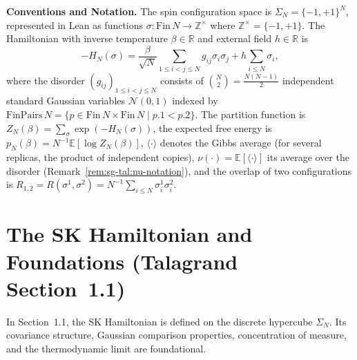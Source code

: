 \medskip\noindent\textbf{Conventions and Notation.}
The spin configuration space is $\Sigma_N = \{-1, +1\}^N$, represented in Lean as functions $\sigma : \mathrm{Fin}\,N \to \mathbb{Z}^\times$ where $\mathbb{Z}^\times = \{-1, +1\}$.
The Hamiltonian with inverse temperature $\beta \in \mathbb{R}$ and external field $h \in \mathbb{R}$ is
\[
-H_N(\sigma) = \frac{\beta}{\sqrt{N}} \sum_{1 \le i < j \le N} g_{ij} \sigma_i \sigma_j + h \sum_{i \le N} \sigma_i,
\]
where the disorder $(g_{ij})_{1 \le i < j \le N}$ consists of $\binom{N}{2} = \frac{N(N-1)}{2}$ independent standard Gaussian variables $\mathcal{N}(0, 1)$ indexed by $\mathrm{FinPairs}\,N = \{p \in \mathrm{Fin}\,N \times \mathrm{Fin}\,N \mid p.1 < p.2\}$.
The partition function is $Z_N(\beta) = \sum_\sigma \exp(-H_N(\sigma))$, the expected free energy is $p_N(\beta) = N^{-1}\mathbb{E}[\log Z_N(\beta)]$, $\langle\cdot\rangle$ denotes the Gibbs average (for several replicas, the product of independent copies), $\nu(\cdot)=\mathbb{E}[\langle\cdot\rangle]$ its average over the disorder (Remark~\ref{rem:sg-tal:nu-notation}), and the overlap of two configurations is $R_{1,2} = R(\sigma^1, \sigma^2) = N^{-1}\sum_{i \le N} \sigma_i^1 \sigma_i^2$.

\section{The SK Hamiltonian and Foundations (Talagrand Section~1.1)}\label{sec:sg-tal:foundations}

In Section~1.1, the SK Hamiltonian is defined on the discrete hypercube $\Sigma_N$.
Its covariance structure, Gaussian comparison properties, concentration of measure, and the thermodynamic limit are foundational.

